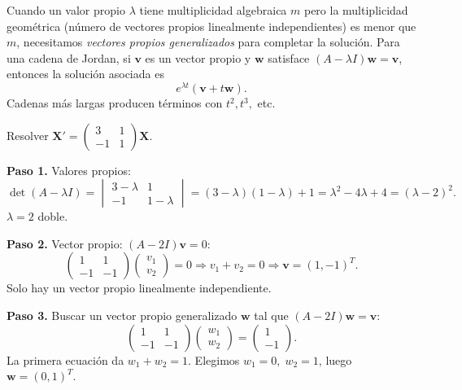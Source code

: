Cuando un valor propio $\lambda$ tiene multiplicidad algebraica $m$ pero la multiplicidad geométrica (número de vectores propios linealmente independientes) es menor que $m$, necesitamos \emph{vectores propios generalizados} para completar la solución. Para una cadena de Jordan, si $\mathbf{v}$ es un vector propio y $\mathbf{w}$ satisface $(A-\lambda I)\mathbf{w}=\mathbf{v}$, entonces la solución asociada es
\[
e^{\lambda t}(\mathbf{v}+t\mathbf{w}).
\]
Cadenas más largas producen términos con $t^2, t^3,$ etc.

\begin{example}
Resolver $\mathbf{X}'=
\begin{pmatrix}
3&1\\
-1&1
\end{pmatrix}\mathbf{X}$.
\begin{myproof}
\textbf{Paso 1.} Valores propios:
\[
\det(A-\lambda I)=
\begin{vmatrix}
3-\lambda&1\\
-1&1-\lambda
\end{vmatrix}
=(3-\lambda)(1-\lambda)+1=\lambda^2-4\lambda+4=(\lambda-2)^2.
\]
$\lambda=2$ doble.

\textbf{Paso 2.} Vector propio:
$(A-2I)\mathbf{v}=0$:
\[
\begin{pmatrix}
1&1\\
-1&-1
\end{pmatrix}
\begin{pmatrix}
v_1\\v_2
\end{pmatrix}=0
\Rightarrow v_1+v_2=0\Rightarrow \mathbf{v}=(1,-1)^T.
\]
Solo hay un vector propio linealmente independiente.

\textbf{Paso 3.} Buscar un vector propio generalizado $\mathbf{w}$ tal que $(A-2I)\mathbf{w}=\mathbf{v}$:
\[
\begin{pmatrix}
1&1\\
-1&-1
\end{pmatrix}
\begin{pmatrix}
w_1\\w_2
\end{pmatrix}
=
\begin{pmatrix}
1\\-1
\end{pmatrix}.
\]
La primera ecuación da $w_1+w_2=1$. Elegimos $w_1=0,\; w_2=1$, luego $\mathbf{w}=(0,1)^T$.


\end{myproof}
\end{example}
